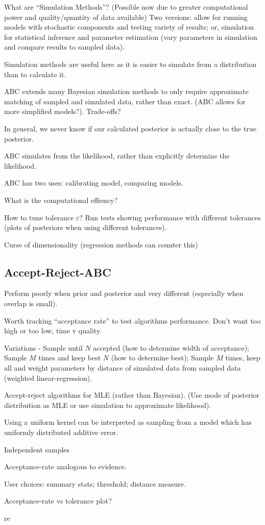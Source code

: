 \documentclass[11pt,a4paper,margin=0]{article}
\theoremstyle{break}
\begin{document}
  \par What are ``Simulation Methods''?  (Possible now due to greater computational power and quality/quantity of data available) Two versions: allow for running models with stochastic components and testing variety of results; or, simulation for statistical inference and parameter estimation (vary parameters in simulation and compare results to sampled data).
  \par Simulation methods are useful here as it is easier to simulate from a distribution than to calculate it.
  \par ABC extends many Bayesian simulation methods to only require approximate matching of sampled and simulated data, rather than exact. (ABC allows for more simplified models?). Trade-offs?
  \par In general, we never know if our calculated posterior is actually close to the true posterior.
  \par ABC simulates from the likelihood, rather than explicitly determine the likelihood.
  \par ABC has two uses: calibrating model, comparing models.
  \par What is the computational effiency?
  \par How to tune tolerance $\varepsilon$? Run tests showing performance with different tolerances (plots of posteriors when using different tolerances).
  \par Curse of dimensionality (regression methods can counter this)

\subsection*{Accept-Reject-ABC}\label{sec_accept_reject_ABC}
  \par Perform poorly when prior and posterior and very different (especially when overlap is small).
  \par Worth tracking ``acceptance rate'' to test algorithms performance. Don't want too high or too low, time v quality.
  \par Variations - Sample until $N$ accepted (how to determine width of acceptance); Sample $M$ times and keep best $N$ (how to determine best); Sample $M$ times, keep all and weight parameters by distance of simulated data from sampled data (weighted linear-regression).
  \par Accept-reject algorithms for MLE (rather than Bayesian). (Use mode of posterior distribution as MLE or use simulation to approximate likelihood).
  \par Using a uniform kernel can be interpreted as sampling from a model which has uniformly distributed additive error.
  \par Independent samples
  \par Acceptance-rate analogous to evidence.
  \par User choices: summary stats; threshold; distance measure.
  \par Acceptance-rate vs tolerance plot?
  \par re
\end{document}
